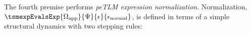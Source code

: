 \documentclass[acmsmall,10pt,review,anonymous]{acmart}\settopmatter{printfolios=true}
\begin{document}
The fourth premise performs \emph{peTLM expression normalization}. Normalization, $\tsmexpEvalsExp{\Omega_\text{app}}{\Psi}{\epsilon}{\epsilon_\text{normal}}$, is defined in terms of a simple structural dynamics with two stepping rules:
\begin{mathpar}

\end{mathpar}
\end{document}
